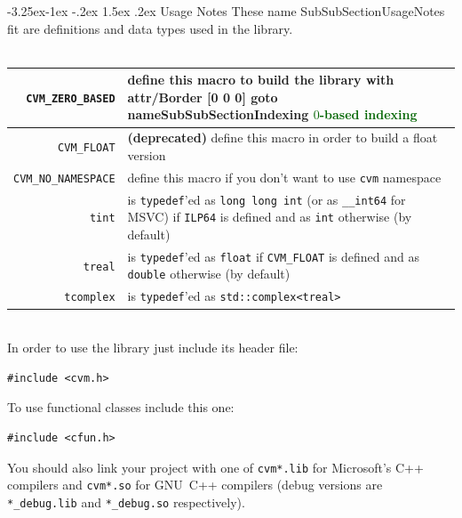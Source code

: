 \documentclass[12pt,letterpaper]{article}
\makeatletter
\newcommand{\GO}[2]{%
\pdfstartlink attr{/Border [0 0 0]}%
goto name{#2}%
\textcolor{darkgreen}{#1}%
\pdfendlink}
\newcommand{\Code}[1]{\texttt{#1}}
\renewcommand\subsubsection{\@startsection{subsubsection}{3}{0mm}%
                                     {-3.25ex\@plus -1ex \@minus -.2ex}%
                                     {1.5ex \@plus .2ex}%
                                     {\normalfont\normalsize\bfseries\sffamily}}
\makeatother
\begin{document}
\subsubsection{Usage Notes}
These%
\pdfdest name {SubSubSectionUsageNotes} fit{}
are definitions and data types used in the library.\\
\phantom{1em}\\
\begin{tabularx}{\textwidth}{|r|Y|} \hline
\Code{CVM\_ZERO\_BASED} & define this macro to build the library with \GO{$0$-based indexing}{SubSubSectionIndexing}
\\ %
\hline
\Code{CVM\_FLOAT} & \textbf{(deprecated)} define this macro in order to build a float version
\\ %
\hline
\Code{CVM\_NO\_NAMESPACE} & define this macro
if you don't want to use \Code{cvm} namespace
\\ %
\hline
\Code{tint} & is \Code{typedef}'ed as \Code{long long int} (or as \Code{\_\_int64} for MSVC)
if \Code{ILP64} is defined and as \Code{int} otherwise (by default)
\\ %
\hline
\Code{treal} & is \Code{typedef}'ed as \Code{float}
if \Code{CVM\_FLOAT} is defined and as \Code{double} otherwise (by default)
\\ %
\hline
\Code{tcomplex} & is \Code{typedef}'ed as
\Code{std::complex<treal>}
\\ %
\hline
\end{tabularx}
\phantom{1em}\\
In order to use the library just include its header file:
\begin{Verbatim}
#include <cvm.h>
\end{Verbatim}
To use functional classes include this one:
\begin{Verbatim}
#include <cfun.h>
\end{Verbatim}
You should also link your project with one of \verb"cvm*.lib"
for Microsoft's C++ compilers
and \verb"cvm*.so" for GNU~C++ compilers
(debug versions are \verb"*_debug.lib" and \verb"*_debug.so"
respectively).
\end{document}
